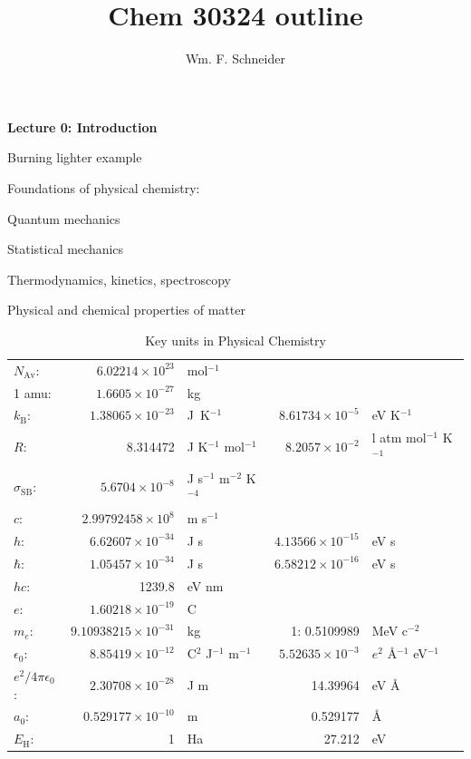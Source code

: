 \documentclass[11pt]{article}
\title{Chem 30324 outline}
\author{Wm. F. Schneider}
\begin{document}
\maketitle
\begin{outline}
\item{{\bf Lecture 0: Introduction}}
  \begin{outline}
  \item{Burning lighter example}
  \item{Foundations of physical chemistry:}
    \begin{outline}
    \item{Quantum mechanics}
    \item{Statistical mechanics}
    \item{Thermodynamics, kinetics, spectroscopy}
    \item{Physical and chemical properties of matter}
    \end{outline}
  \end{outline}

\begin{table}
\begin{center}
\caption{Key units in Physical Chemistry}
\begin{tabular}{|lrlrl|} 
  \hline
  $N_\mathrm{Av}$: & $6.02214 \times 10^{23}$& mol$^{-1}$  & & \\
  1 amu: & $1.6605\times 10^{-27}$ & kg & & \\
  $k_\mathrm{B}$: & $1.38065\times 10^{-23}$ & J~K$^{-1}$ & $8.61734\times
  10^{-5}$ & eV K$^{-1}$\\
  $R$: & 8.314472 & J K$^{-1}$ mol$^{-1}$ & $8.2057 \times 10^{-2}$ & l atm mol$^{-1}$ K$^{-1}$\\
  $\sigma_\mathrm{SB}$: & $5.6704\times 10^{-8}$ & J s$^{-1}$ m$^{-2}$ K$^{-4}$ & & \\
  $c$: & $2.99792458\times 10^8$ & m s$^{-1}$ & & \\
  $h$: & $6.62607\times 10^{-34}$ & J s & $4.13566\times 10^{-15}$ & eV s
  \\
  $\hbar$: & $1.05457\times 10^{-34}$ & J s & $6.58212\times 10^{-16}$&  eV s \\
  $hc$: & 1239.8 & eV nm  & & \\
  $e$: & $1.60218\times 10^{-19}$ &  C & & \\
  $m_e:$ & $9.10938215\times 10^{-31}$ & kg &1:  0.5109989 & MeV c$^{-2}$  \\
  $\epsilon_0$: & $8.85419 \times 10^{-12}$ & C$^2$ J$^{-1}$ m$^{-1}$ & $5.52635\times
  10^{-3}$ & $e^2$ \AA$^{-1}$ eV$^{-1}$ \\
  $e^2/4\pi\epsilon_0$: & $2.30708 \times 10^{-28}$&  J m & 14.39964 & eV \AA\\
  $a_0$: & $0.529177 \times 10^{-10}$ & m & 0.529177 & \AA\\
  $E_\mathrm{H} $: & 1 & Ha & 27.212 & eV \\
  \hline
\end{tabular}
\end{center}
\end{table}



\end{outline}
\end{document}
